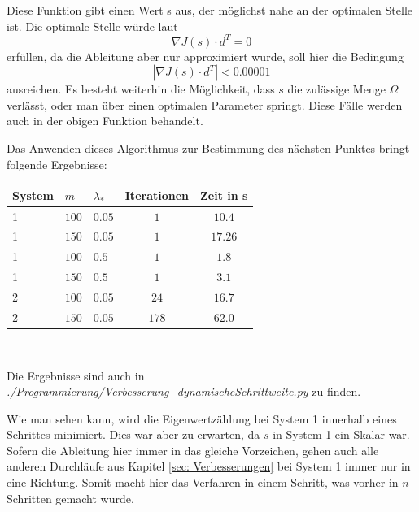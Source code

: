 \documentclass[a4paper,12pt]{report}
\newcommand{\1}{\mathds{1}}
\theoremstyle{plain} %
\theoremstyle{definition} %
\theoremstyle{remark}
\begin{document}
            Diese Funktion gibt einen Wert s aus, der möglichst nahe an der optimalen Stelle ist.
            Die optimale Stelle würde laut \cite[S. 286]{optimierungBurkhard}
            $$\nabla J(s)\cdot d^T = 0$$
            erfüllen, da die Ableitung aber nur approximiert wurde, soll hier die Bedingung
            $$|\nabla J(s)\cdot d^T| < 0.00001$$
            ausreichen.
            Es besteht weiterhin die Möglichkeit, dass $s$ die zulässige Menge $\Omega$ verlässt, oder man über einen optimalen Parameter springt.
            Diese Fälle werden auch in der obigen Funktion behandelt.

            Das Anwenden dieses Algorithmus zur Bestimmung des nächsten Punktes bringt folgende Ergebnisse:
            \begin{table}[!ht]
                  \centering
                  \begin{tabular}{lllcc}
                       System & $m$ & $\lambda_*$ & Iterationen & Zeit in s\\
                       \hline
                       1 & $100$ & $0.05$ & $1$ & $10.4$ \\ 
                       1 & $150$ & $0.05$ & $1$ & $17.26$ \\
                       \hline
                       1 & $100$ & $0.5$ & $1$ & $1.8$ \\
                       1 & $150$ & $0.5$ & $1$ & $3.1$ \\
                       \hline
                       2 & $100$ & $0.05$ & $24$ & $16.7$ \\
                       2 & $150$ & $0.05$ & $178$ & $62.0$ \\
                       \hline
                  \end{tabular}\\
                  \label{tab: Ergebnisse_dynamischSchritt}
            \end{table}

            Die Ergebnisse sind auch in \textit{./Programmierung/Verbesserung\_dynamischeSchrittweite.py} zu finden.

            Wie man sehen kann, wird die Eigenwertzählung bei System 1 innerhalb eines Schrittes minimiert.
            Dies war aber zu erwarten, da $s$ in System 1 ein Skalar war.
            Sofern die Ableitung hier immer in das gleiche Vorzeichen, gehen auch alle anderen Durchläufe aus Kapitel \ref{sec: Verbesserungen} bei System 1 immer nur in eine Richtung.
            Somit macht hier das Verfahren in einem Schritt, was vorher in $n$ Schritten gemacht wurde.
\end{document}
